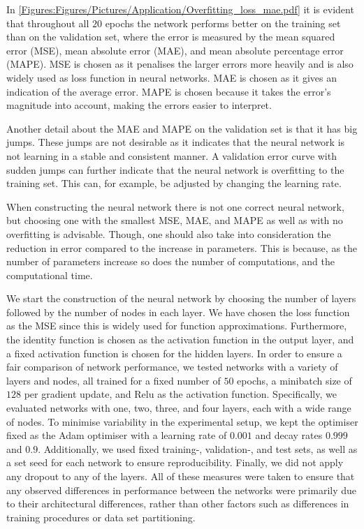 
In \autoref{Figures:Figures/Pictures/Application/Overfitting_loss_mae.pdf} it is evident that throughout all $20$ epochs the network performs better on the training set than on the validation set, where the error is measured by the mean squared error (MSE), mean absolute error (MAE), and mean absolute percentage error (MAPE). MSE is chosen as it penalises the larger errors more heavily and is also widely used as loss function in neural networks. MAE is chosen as it gives an indication of the average error. MAPE is chosen because it takes the error's magnitude into account, making the errors easier to interpret.

Another detail about the MAE and MAPE on the validation set is that it has big jumps. These jumps are not desirable as it indicates that the neural network is not learning in a stable and consistent manner. A validation error curve with sudden jumps can further indicate that the neural network is overfitting to the training set. This can, for example, be adjusted by changing the learning rate. 

When constructing the neural network there is not one correct neural network, but choosing one with the smallest MSE, MAE, and MAPE as well as with no overfitting is advisable. Though, one should also take into consideration the reduction in error compared to the increase in parameters. This is because, as the number of parameters increase so does the number of computations, and the computational time.

We start the construction of the neural network by choosing the number of layers followed by the number of nodes in each layer. We have chosen the loss function as the MSE since this is widely used for function approximations. Furthermore, the identity function is chosen as the activation function in the output layer, and a fixed activation function is chosen for the hidden layers. In order to ensure a fair comparison of network performance, we tested networks with a variety of layers and nodes, all trained for a fixed number of $50$ epochs, a minibatch size of $128$ per gradient update, and Relu as the activation function. Specifically, we evaluated networks with one, two, three, and four layers, each with a wide range of nodes. To minimise variability in the experimental setup, we kept the optimiser fixed as the Adam optimiser with a learning rate of $0.001$ and decay rates $0.999$ and $0.9$. Additionally, we used fixed training-, validation-, and test sets, as well as a set seed for each network to ensure reproducibility. Finally, we did not apply any dropout to any of the layers. All of these measures were taken to ensure that any observed differences in performance between the networks were primarily due to their architectural differences, rather than other factors such as differences in training procedures or data set partitioning.

